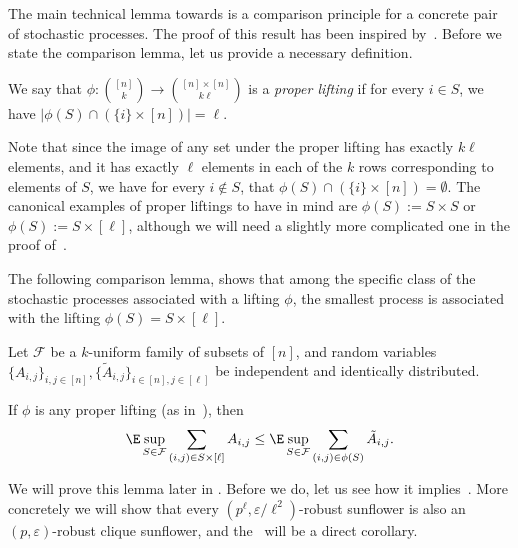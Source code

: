 \thmrcbcomparison*

The main technical lemma towards  is a comparison principle for a concrete pair of stochastic processes.  The proof of this result has been inspired by~\cite{talagrand93}. Before we state the comparison lemma, let us provide a necessary definition.
\begin{definition} 
\label{def:proper-lifting}
We say that $\phi : \binom{[n]}{k} \to \binom{[n] \times [n]}{k\ell}$ is a \emph{proper lifting} if for every $i \in S$, we have $|\phi(S) \cap (\{i\} \times [n])| = \ell$. 
\end{definition}
Note that since the image of any set under the proper lifting has exactly $k \ell$ elements, and it has exactly $\ell$ elements in each of the $k$ rows corresponding to elements of $S$, we have for every $i\not\in S$, that $\phi(S) \cap (\{i \} \times [n]) = \emptyset$. The canonical examples of proper liftings to have in mind are $\phi(S) := S\times S$ or $\phi(S) := S\times [\ell]$, although we will need a slightly more complicated one in the proof of~.

The following comparison lemma, shows that among the specific class of the stochastic processes associated with a lifting $\phi$, the smallest process is associated with the lifting $\phi(S) = S\times [\ell]$.
\begin{lemma}
\label{lem:comparison-lemma}
    Let $\mathcal{F}$ be a $k$-uniform family of subsets of $[n]$, and random variables $\{A_{i,j}\}_{i,j \in [n]}, \{\tilde{A}_{i,j}\}_{i\in [n], j \in [\ell]}$ be independent and identically distributed.

    If $\phi$ is any proper lifting (as in~), then
    \begin{equation}
    \label{eq:comparison-lemma}
        \E \sup_{S \in \mathcal{F}} \sum_{(i, j) \in S \times [\ell]} A_{i,j} \leq \E \sup_{S \in \mathcal{F}} \sum_{(i,j) \in \phi(S)} \tilde{A}_{i,j}.
    \end{equation}
\end{lemma}
We will prove this lemma later in . Before we do, let us see how it implies~. More concretely we will show that every $(p^\ell, \varepsilon/\ell^2)$-robust sunflower is also an $(p, \varepsilon)$-robust clique sunflower, and the~ will be a direct corollary.

